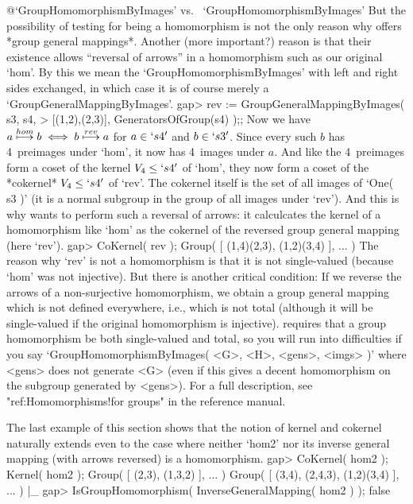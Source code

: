 %
%
{@\noexpand `GroupHomomorphismByImages' vs.\ %
\noexpand `GroupHomomorphismByImages'}%
But the  possibility of testing for being  a homomorphism is not the only
reason  why    {\GAP} offers  *group   general  mappings*.  Another (more
important?) reason is that  their existence allows ``reversal of arrows''
in a  homomorphism such   as  our original  `hom'. By   this we mean  the
`GroupHomomorphismByImages' with left and right sides exchanged, in which
case it is of course merely a `GroupGeneralMappingByImages'.
\beginexample
    gap> rev := GroupGeneralMappingByImages( s3, s4,
    >           [(1,2),(2,3)], GeneratorsOfGroup(s4) );;
\endexample
Now   we    have $a\buildrel   hom\over\longmapsto    b   \iff b\buildrel
rev\over\longmapsto a$ for $a\in `s4'$ and $b\in  `s3'$. Since every such
$b$ has 4~preimages under `hom', it now  has 4~images under $a$. And like
the 4~preimages form  a coset of the kernel  $V_4\le `s4'$ of `hom', they
now form a  coset of the *cokernel*  $V_4\le `s4'$ of `rev'. The cokernel
itself is the set of all images of `One(  s3 )' (it  is a normal subgroup
in the group of all images under `rev'). And this is  why {\GAP} wants to
perform  such a  reversal   of arrows:  it  calculcates the  kernel  of a
homomorphism like  `hom' as the   cokernel of the reversed group  general
mapping (here `rev').
\beginexample
    gap> CoKernel( rev );
    Group( [ (1,4)(2,3), (1,2)(3,4) ], ... )
\endexample
{}%
%
The  reason  why  `rev'   is not  a    homomorphism is  that   it is  not
single-valued  (because `hom' was   not injective). But there  is another
critical  condition: If   we   reverse the arrows   of  a  non-surjective
homomorphism,  we  obtain a group  general mapping  which  is not defined
everywhere, i.e.,  which is not total  (although it will be single-valued
if the original homomorphism is  injective). {\GAP} requires that a group
homomorphism be  both  single-valued  and total,  so  you will   run into
difficulties if you   say `GroupHomomorphismByImages( <G>,   <H>, <gens>,
<imgs> )' where <gens> does not generate <G> (even if this gives a decent
homomorphism  on   the subgroup   generated   by   <gens>).  For  a  full
description, see "ref:Homomorphisms!for groups" in the reference manual.

The last  example of this   section shows that  the  notion of kernel and
cokernel naturally extends even to the case  where neither `hom2' nor its
inverse general mapping (with arrows reversed) is a homomorphism.
\beginexample
    gap> CoKernel( hom2 );  Kernel( hom2 );
    Group( [ (2,3), (1,3,2) ], ... )
    Group( [ (3,4), (2,4,3), (1,2)(3,4) ], ... )
|_
    gap> IsGroupHomomorphism( InverseGeneralMapping( hom2 ) );
    false
\endexample

